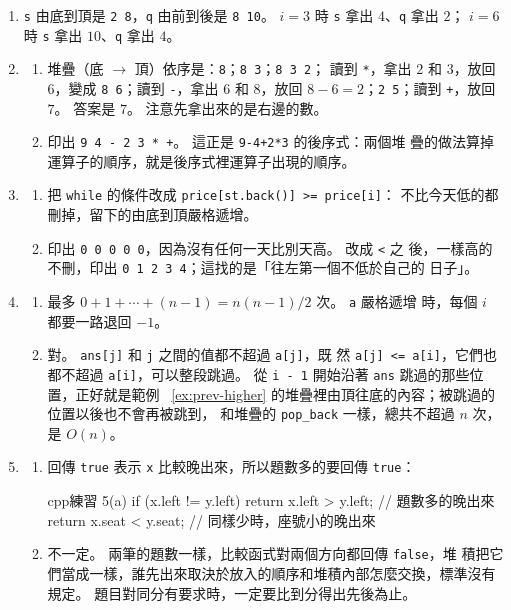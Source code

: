 \begin{enumerate}
\item \texttt{s} 由底到頂是 \texttt{2 8}，\texttt{q} 由前到後是
\texttt{8 10}。 $i = 3$ 時 \texttt{s} 拿出 $4$、\texttt{q} 拿出 $2$；
$i = 6$ 時 \texttt{s} 拿出 $10$、\texttt{q} 拿出 $4$。

\item
\begin{enumerate}
\item 堆疊（底 $\to$ 頂）依序是：\texttt{8}；\texttt{8 3}；\texttt{8 3 2}；
讀到 \texttt{*}，拿出 $2$ 和 $3$，放回 $6$，變成 \texttt{8 6}；讀到
\texttt{-}，拿出 $6$ 和 $8$，放回 $8 - 6 = 2$；\texttt{2 5}；讀到
\texttt{+}，放回 $7$。 答案是 $7$。 注意先拿出來的是右邊的數。
\item 印出 \texttt{9 4 - 2 3 * +}。 這正是 \texttt{9-4+2*3} 的後序式：兩個堆
疊的做法算掉運算子的順序，就是後序式裡運算子出現的順序。
\end{enumerate}

\item
\begin{enumerate}
\item 把 \texttt{while} 的條件改成 \texttt{price[st.back()] >= price[i]}：
不比今天低的都刪掉，留下的由底到頂嚴格遞增。
\item 印出 \texttt{0 0 0 0 0}，因為沒有任何一天比別天高。 改成 \texttt{<} 之
後，一樣高的不刪，印出 \texttt{0 1 2 3 4}；這找的是「往左第一個不低於自己的
日子」。
\end{enumerate}

\item
\begin{enumerate}
\item 最多 $0 + 1 + \cdots + (n - 1) = n(n - 1)/2$ 次。 \texttt{a} 嚴格遞增
時，每個 $i$ 都要一路退回 $-1$。
\item 對。 \texttt{ans[j]} 和 \texttt{j} 之間的值都不超過 \texttt{a[j]}，既
然 \texttt{a[j] <= a[i]}，它們也都不超過 \texttt{a[i]}，可以整段跳過。 從
\texttt{i - 1} 開始沿著 \texttt{ans} 跳過的那些位置，正好就是範例
~\ref{ex:prev-higher} 的堆疊裡由頂往底的內容；被跳過的位置以後也不會再被跳到，
和堆疊的 \texttt{pop\_back} 一樣，總共不超過 $n$ 次，是 $O(n)$。
\end{enumerate}

\item
\begin{enumerate}
\item 回傳 \texttt{true} 表示 \texttt{x} 比較晚出來，所以題數多的要回傳
\texttt{true}：
\begin{code}{cpp}{練習 5(a)}
if (x.left != y.left) {
    return x.left > y.left;   // 題數多的晚出來
}
return x.seat < y.seat;       // 同樣少時，座號小的晚出來
\end{code}
\item 不一定。 兩筆的題數一樣，比較函式對兩個方向都回傳 \texttt{false}，堆
積把它們當成一樣，誰先出來取決於放入的順序和堆積內部怎麼交換，標準沒有規定。
題目對同分有要求時，一定要比到分得出先後為止。
\end{enumerate}


\end{enumerate}
